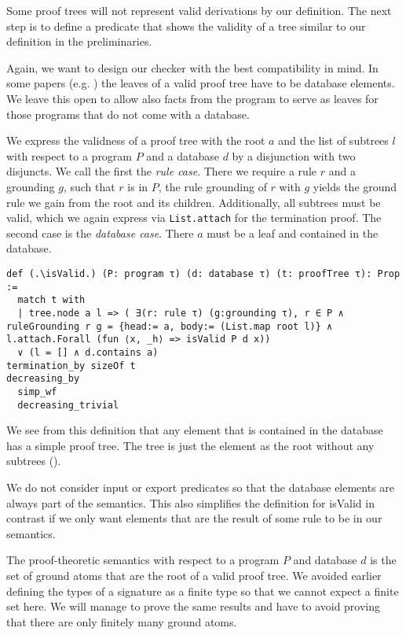 Some proof trees will not represent valid derivations by our definition. The next step is to define a predicate that shows the validity of a tree similar to our definition in the preliminaries.

Again, we want to design our checker with the best compatibility in mind. In some papers (e.g. \cite{ComplexityProvDatalog}) the leaves of a valid proof tree have to be database elements. We leave this open to allow also facts from the program to serve as leaves for those programs that do not come with a database.

We express the validness of a proof tree with the root $a$ and the list of subtrees $l$ with respect to a program $P$ and a database $d$ by a disjunction with two disjuncts. We call the first the \textit{rule case}. There we require a rule $r$ and a grounding $g$, such that $r$ is in $P$, the rule grounding of $r$ with $g$ yields the ground rule we gain from the root and its children. Additionally, all subtrees must be valid, which we again express via \lstinline|List.attach| for the termination proof. 
The second case is the \textit{database case}. There $a$ must be a leaf and contained in the database.

\begin{lstlisting}
def (.\isValid.) (P: program τ) (d: database τ) (t: proofTree τ): Prop :=
  match t with
  | tree.node a l => ( ∃(r: rule τ) (g:grounding τ), r ∈ P ∧ ruleGrounding r g = {head:= a, body:= (List.map root l)} ∧ l.attach.Forall (fun ⟨x, _h⟩ => isValid P d x)) 
  ∨ (l = [] ∧ d.contains a)
termination_by sizeOf t
decreasing_by
  simp_wf
  decreasing_trivial
\end{lstlisting}

We see from this definition that any element that is contained in the database has a simple proof tree. The tree is just the element as the root without any subtrees (\databaseElementsHaveValidProofTree). 

We do not consider input or export predicates so that the database elements are always part of the semantics. This also simplifies the definition for isValid in contrast if we only want elements that are the result of some rule to be in our semantics.

The proof-theoretic semantics with respect to a program $P$ and database $d$ is the set of ground atoms that are the root of a valid proof tree. We avoided earlier defining the types of a signature as a finite type so that we cannot expect a finite set here. We will manage to prove the same results and have to avoid proving that there are only finitely many ground atoms.

